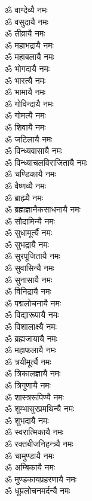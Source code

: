 \begin{multicols}{2}
\begin{flushleft}
ॐ वाग्देव्यै नमः\\
ॐ वसुदायै नमः\\
ॐ तीव्रायै नमः\\
ॐ महाभद्रायै नमः\\
ॐ महाबलायै नमः\\
ॐ भोगदायै नमः\\
ॐ भारत्यै नमः\\
ॐ भामायै नमः\\
ॐ गोविन्दायै नमः\\
ॐ गोमत्यै नमः\hfill{}\\
ॐ शिवायै नमः\\
ॐ जटिलायै नमः\\
ॐ विन्ध्यवासायै नमः\\
ॐ विन्ध्याचलविराजितायै नमः\\
ॐ चण्डिकायै नमः\\
ॐ वैष्णव्यै नमः\\
ॐ ब्राह्म्यै नमः\\
ॐ ब्रह्मज्ञानैकसाधनायै नमः\\
ॐ सौदामिन्यै नमः\\
ॐ सुधामूर्त्यै नमः\hfill{}\\
ॐ सुभद्रायै नमः\\
ॐ सुरपूजितायै नमः\\
ॐ सुवासिन्यै नमः\\
ॐ सुनासायै नमः\\
ॐ विनिद्रायै नमः\\
ॐ पद्मलोचनायै नमः\\
ॐ विद्यारूपायै नमः\\
ॐ विशालाक्ष्यै नमः\\
ॐ ब्रह्मजायायै नमः\\
ॐ महाफलायै नमः\hfill{}\\
ॐ त्रयीमूर्त्यै नमः\\
ॐ त्रिकालज्ञायै नमः\\
ॐ त्रिगुणायै नमः\\
ॐ शास्त्ररूपिण्यै नमः\\
ॐ शुम्भासुरप्रमथिन्यै नमः\\
ॐ शुभदायै नमः\\
ॐ स्वरात्मिकायै नमः\\
ॐ रक्तबीजनिहन्त्र्यै नमः\\
ॐ चामुण्डायै नमः\\
ॐ अम्बिकायै नमः\hfill{}\\
ॐ मुण्डकायप्रहरणायै नमः\\
ॐ धूम्रलोचनमर्दन्यै नमः\\

\end{flushleft}
\end{multicols}
